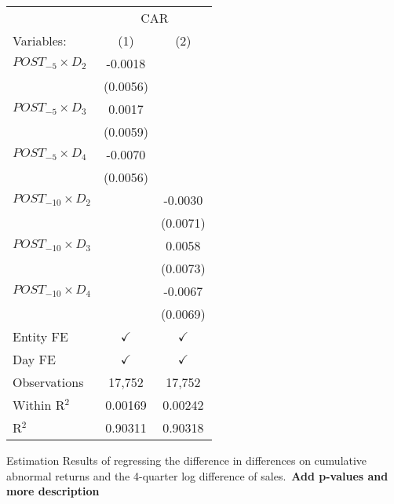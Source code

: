 \documentclass[12pt]{article}
\begin{document}
\begin{table}
    \centering

    \begin{tabular}{lcc}
    \toprule
                                                & \multicolumn{2}{c}{CAR}\\
        Variables:                              & (1)           & (2)\\
    \midrule
    $POST_{-5} \times D_2$      & -0.0018       &   \\
                                            & (0.0056)      &   \\
    $POST_{-5} \times D_3$      & 0.0017        &   \\
                                            & (0.0059)      &   \\   
    $POST_{-5} \times D_4$      & -0.0070       &   \\
                                            & (0.0056)      &   \\
    $POST_{-10} \times D_2$     &               & -0.0030\\
                                            &               & (0.0071)\\
    $POST_{-10} \times D_3$     &               & 0.0058\\
                                            &               & (0.0073)\\
    $POST_{-10} \times D_4$     &               & -0.0067\\
                                            &               & (0.0069)\\
        Entity FE              & $\checkmark$  & $\checkmark$\\
        Day FE              & $\checkmark$  & $\checkmark$\\   
        Observations                            & 17,752        & 17,752\\
        Within R$^2$                            & 0.00169       & 0.00242\\
        R$^2$                                   & 0.90311       & 0.90318\\
    \bottomrule
    \end{tabular}
    
    \begin{tablenotes}
        \footnotesize
    \item Estimation Results of regressing the difference in differences on cumulative abnormal returns and the 4-quarter log difference of sales.\ \textbf{Add p-values and more description}
    \end{tablenotes}
\end{table}
\end{document}
